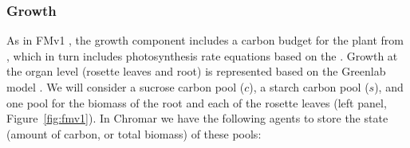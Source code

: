\subsubsection*{Growth}
As in FMv1 \citep{chew_multiscale_2014}, the growth component includes a carbon
budget for the plant from \citet{rasse_leaf_2006}, which in turn includes
photosynthesis rate equations based on the \citet{farquhar_biochemical_1980}
. Growth at the organ level (rosette leaves and root) is represented based on
the Greenlab model \citep{christophe_model-based_2008}. We will consider a
sucrose carbon pool (\(c\)), a starch carbon pool (\(s\)), and one pool for the
biomass of the root and each of the rosette leaves (left panel, Figure~\ref{fig:fmv1}). In
Chromar we have the following agents to store the state (amount of carbon, or
total biomass) of these pools:
\begin{figure}[p]
\centering
{}
\end{figure}
